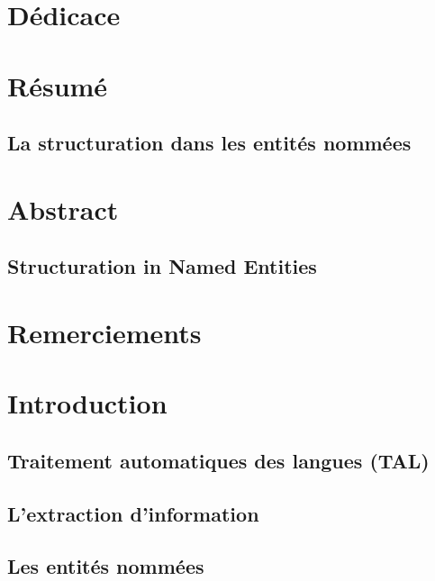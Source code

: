\documentclass[12pt,a4paper,times,twoside,openright]{report}
\begin{document}
\chapter*{Dédicace}


\chapter*{Résumé}
\section*{La structuration dans les entités nommées}


\chapter*{Abstract}
\section*{Structuration in Named Entities}


\chapter*{Remerciements}


\dominitoc
\tableofcontents

\chapter{Introduction}
\label{chap:introduction}
\minitoc

    
    \section{Traitement automatiques des langues (TAL)}
    \label{sec:NLP}
    
    
    \section{L'extraction d'information}
    \label{sec:EI-introduction}
    
    
    \section{Les entités nommées}
    \label{sec:NE-introduction}
    
\end{document}
